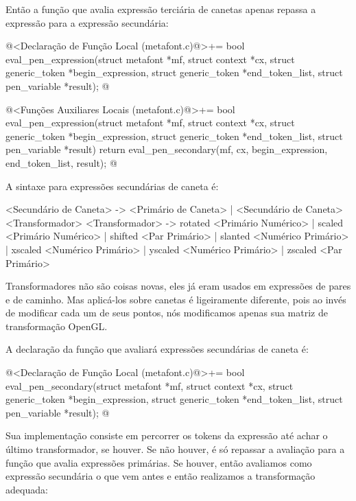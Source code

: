{Então a função que avalia expressão terciária de canetas apenas
repassa a expressão para a expressão secundária:

\iniciocodigo
@<Declaração de Função Local (metafont.c)@>+=
bool eval_pen_expression(struct metafont *mf, struct context *cx,
                        struct generic_token *begin_expression,
                        struct generic_token *end_token_list,
                        struct pen_variable *result);
@
\fimcodigo

\iniciocodigo
@<Funções Auxiliares Locais (metafont.c)@>+=
bool eval_pen_expression(struct metafont *mf, struct context *cx,
                        struct generic_token *begin_expression,
                        struct generic_token *end_token_list,
                        struct pen_variable *result){
  return eval_pen_secondary(mf, cx, begin_expression, end_token_list, result);
}
@
\fimcodigo


A sintaxe para expressões secundárias de caneta é:

\alinhaverbatim
<Secundário de Caneta> -> <Primário de Caneta> |
                          <Secundário de Caneta> <Transformador>
<Transformador> -> rotated <Primário Numérico> |
                   scaled <Primário Numérico> |
                   shifted <Par Primário> |
                   slanted <Numérico Primário> |
                   xscaled <Numérico Primário> |
                   yscaled <Numérico Primário> |
                   zscaled <Par Primário>
\alinhanormal

Transformadores não são coisas novas, eles já eram usados em
expressões de pares e de caminho. Mas aplicá-los sobre canetas é
ligeiramente diferente, pois ao invés de modificar cada um de seus
pontos, nós modificamos apenas sua matriz de transformação OpenGL.

A declaração da função que avaliará expressões secundárias de caneta
é:

\iniciocodigo
@<Declaração de Função Local (metafont.c)@>+=
bool eval_pen_secondary(struct metafont *mf, struct context *cx,
                        struct generic_token *begin_expression,
                        struct generic_token *end_token_list,
                        struct pen_variable *result);
@
\fimcodigo

Sua implementação consiste em percorrer os tokens da expressão até
achar o último transformador, se houver. Se não houver, é só repassar
a avaliação para a função que avalia expressões primárias. Se houver,
então avaliamos como expressão secundária o que vem antes e então
realizamos a transformação adequada:

}
